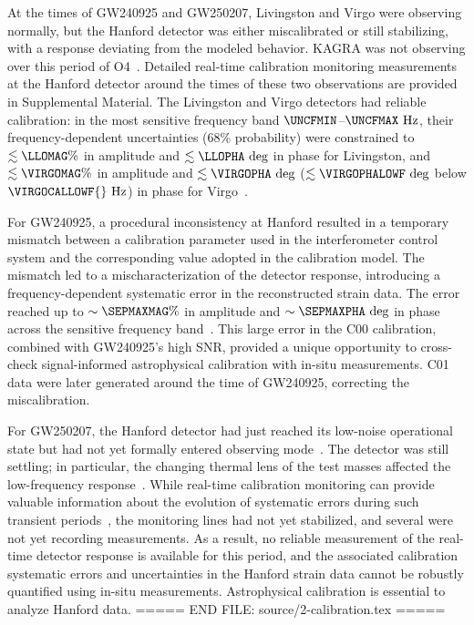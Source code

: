 At the times of \ac{GW240925} and \ac{GW250207}, Livingston and Virgo were observing normally, but the Hanford detector was either miscalibrated or still stabilizing, with a response deviating from the modeled behavior.
KAGRA was not observing over this period of \ac{O4}~\cite{LIGOScientific:2025hdt}.
Detailed real-time calibration monitoring measurements~\cite{Wade:2025tgt} at the Hanford detector around the times of these two observations are provided in Supplemental Material\citesupp.
The Livingston and Virgo detectors had reliable calibration: in the most sensitive frequency band $\UNCFMIN$--$\UNCFMAX~\mathrm{Hz}$, their frequency-dependent uncertainties ($68\%$ probability) were constrained to {$\lesssim \LLOMAG\%$} in amplitude and {$\lesssim\LLOPHA~\mathrm{deg}$} in phase for Livingston, and {$\lesssim\VIRGOMAG \%$} in amplitude and {$\lesssim\VIRGOPHA~\mathrm{deg}$} ($\lesssim\VIRGOPHALOWF~\mathrm{deg}$ below $\VIRGOCALLOWF{}~\mathrm{Hz}$) in phase for Virgo~\cite{Aubin:2025dsv}.

For \ac{GW240925}, a procedural inconsistency at Hanford resulted in a temporary mismatch between a calibration parameter used in the interferometer control system and the corresponding value adopted in the calibration model.
The mismatch led to a mischaracterization of the detector response, introducing a frequency-dependent systematic error in the reconstructed strain data.
The error reached up to $\sim \SEPMAXMAG \%$ in amplitude and $\sim \SEPMAXPHA~\mathrm{deg}$ in phase across the sensitive frequency band~\cite{Betzwieser:2025aaa}.
This large error in the \ac{C00} calibration, combined with \ac{GW240925}'s high \ac{SNR}, provided a unique opportunity to cross-check signal-informed astrophysical calibration with in-situ measurements.
\ac{C01} data were later generated around the time of \ac{GW240925}, correcting the miscalibration.

For \ac{GW250207}, the Hanford detector had just reached its low-noise operational state but had not yet formally entered observing mode~\cite{Betzwieser:2025aaa}.
The detector was still settling; in particular, the changing thermal lens of the test masses affected the low-frequency response~\cite{Capote:2024rmo}.
While real-time calibration monitoring can provide valuable information about the evolution of systematic errors during such transient periods~\cite{Wade:2025tgt}, the monitoring lines had not yet stabilized, and several were not yet recording measurements.
As a result, no reliable measurement of the real-time detector response is available for this period, and the associated calibration systematic errors and uncertainties in the Hanford strain data cannot be robustly quantified using in-situ measurements.
Astrophysical calibration is essential to analyze Hanford data.
===== END FILE: source/2-calibration.tex =====

